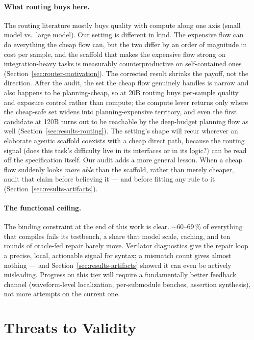\paragraph{What routing buys here.}
The routing literature mostly buys quality with compute along one axis
(small model vs.\ large model). Our setting is different in kind. The
expensive flow can do everything the cheap flow can, but the two
differ by an order of magnitude in cost per sample, and the scaffold
that makes the expensive flow strong on integration-heavy tasks is
measurably counterproductive on self-contained ones
(Section~\ref{sec:router-motivation}). The corrected result shrinks
the payoff, not the direction. After the audit, the set the cheap flow
genuinely handles is narrow and also happens to be planning-cheap, so
at 20B routing buys per-sample quality and exposure control rather
than compute; the compute lever returns only where the cheap-safe set
widens into planning-expensive territory, and even the first candidate
at 120B turns out to be reachable by the deep-budget planning flow as well
(Section~\ref{sec:results-routing}). The setting's shape will recur
wherever an elaborate agentic scaffold coexists with a cheap direct
path, because the routing signal (does this task's difficulty live in
its interfaces or in its logic?) can be read off the specification
itself. Our audit adds a more general lesson. When a cheap flow
suddenly looks \emph{more able} than the scaffold, rather than merely
cheaper, audit that claim before believing it --- and before fitting
any rule to it (Section~\ref{sec:results-artifacts}).

\paragraph{The functional ceiling.}
The binding constraint at the end of this work is clear.
${\sim}60$--69\,\% of everything that compiles fails its testbench, a
share that model scale, caching, and ten rounds of
oracle-fed repair barely move. Verilator diagnostics give the
repair loop a precise, local, actionable signal for syntax; a mismatch
count gives almost nothing --- and Section~\ref{sec:results-artifacts}
showed it can even be actively misleading. Progress on this tier will
require a fundamentally better feedback channel (waveform-level
localization, per-submodule benches, assertion synthesis), not more
attempts on the current one.

\section{Threats to Validity}
\label{sec:threats}

